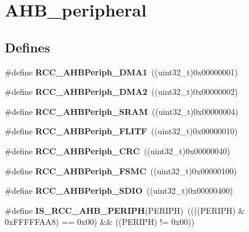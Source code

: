 \hypertarget{group__AHB__peripheral}{
\section{AHB\_\-peripheral}
\label{group__AHB__peripheral}
}
\subsection*{Defines}
\begin{DoxyCompactItemize}
\item 
\hypertarget{group__AHB__peripheral_gaf32783f8481c4343726994073918b3ff}{
\#define {\bfseries RCC\_\-AHBPeriph\_\-DMA1}~((uint32\_\-t)0x00000001)}
\label{group__AHB__peripheral_gaf32783f8481c4343726994073918b3ff}

\item 
\hypertarget{group__AHB__peripheral_ga5afb68e40dc0b0f1aa00466e49bc9e70}{
\#define {\bfseries RCC\_\-AHBPeriph\_\-DMA2}~((uint32\_\-t)0x00000002)}
\label{group__AHB__peripheral_ga5afb68e40dc0b0f1aa00466e49bc9e70}

\item 
\hypertarget{group__AHB__peripheral_ga8aec305b766b1c0ae297f8e1be103bd1}{
\#define {\bfseries RCC\_\-AHBPeriph\_\-SRAM}~((uint32\_\-t)0x00000004)}
\label{group__AHB__peripheral_ga8aec305b766b1c0ae297f8e1be103bd1}

\item 
\hypertarget{group__AHB__peripheral_ga4277d70aa6b5e0b1ec6c8fb8180aac08}{
\#define {\bfseries RCC\_\-AHBPeriph\_\-FLITF}~((uint32\_\-t)0x00000010)}
\label{group__AHB__peripheral_ga4277d70aa6b5e0b1ec6c8fb8180aac08}

\item 
\hypertarget{group__AHB__peripheral_gaef0cd08bcf96323324f328675ccd5ac3}{
\#define {\bfseries RCC\_\-AHBPeriph\_\-CRC}~((uint32\_\-t)0x00000040)}
\label{group__AHB__peripheral_gaef0cd08bcf96323324f328675ccd5ac3}

\item 
\hypertarget{group__AHB__peripheral_ga857dbf7044a974efb142c4450eafd609}{
\#define {\bfseries RCC\_\-AHBPeriph\_\-FSMC}~((uint32\_\-t)0x00000100)}
\label{group__AHB__peripheral_ga857dbf7044a974efb142c4450eafd609}

\item 
\hypertarget{group__AHB__peripheral_gaa2664a55eedcedff22532982ae753566}{
\#define {\bfseries RCC\_\-AHBPeriph\_\-SDIO}~((uint32\_\-t)0x00000400)}
\label{group__AHB__peripheral_gaa2664a55eedcedff22532982ae753566}

\item 
\hypertarget{group__AHB__peripheral_ga5fbf97a9c9f5742c94cde6ffe389aedc}{
\#define {\bfseries IS\_\-RCC\_\-AHB\_\-PERIPH}(PERIPH)~((((PERIPH) \& 0xFFFFFAA8) == 0x00) \&\& ((PERIPH) != 0x00))}
\label{group__AHB__peripheral_ga5fbf97a9c9f5742c94cde6ffe389aedc}

\end{DoxyCompactItemize}
